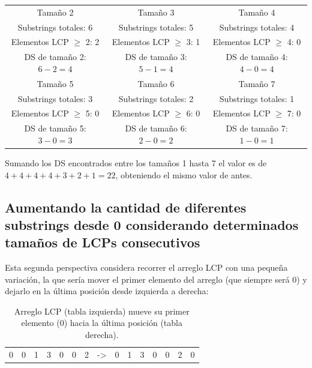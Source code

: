 \begin{table}[H]
\centering
\label{propuesta-12}
\begin{tabular}{|c|c|c|}
\hline
Tamaño 2     & Tamaño 3      &  Tamaño 4   \\
Substrings totales: 6      &  Substrings totales: 5    & Substrings totales: 4   \\
Elementos LCP $\geq$ 2: 2       & Elementos LCP $\geq$ 3: 1       & Elementos LCP $\geq$ 4: 0      \\
DS de tamaño 2: $6-2 = 4$      & DS de tamaño 3: $5-1 = 4$          & DS de tamaño 4: $4-0 = 4$            \\ \hline
Tamaño 5     & Tamaño 6      &  Tamaño 7   \\
Substrings totales: 3      &  Substrings totales: 2    & Substrings totales: 1   \\
Elementos LCP $\geq$ 5: 0       & Elementos LCP $\geq$ 6: 0       & Elementos LCP $\geq$ 7: 0      \\
DS de tamaño 5: $3-0 = 3$      & DS de tamaño 6: $2-0 = 2$          & DS de tamaño 7: $1-0 = 1$            \\ \hline
\end{tabular}
\end{table}

Sumando los DS encontrados entre los tamaños 1 hasta 7 el valor es de $4+4+4+4+3+2+1=22$, obteniendo el mismo valor de antes.

\subsection{Aumentando la cantidad de diferentes substrings desde 0 considerando determinados tamaños de LCPs consecutivos}

Esta segunda perspectiva considera recorrer el arreglo LCP con una pequeña variación, la que sería mover el primer elemento del arreglo (que siempre será 0) y dejarlo en la última posición desde izquierda a derecha:

\begin{table}[h]
\centering
\label{propuesta-2}
\begin{tabular}{|l|l|l|l|l|l|l|l|l|l|l|l|l|l|l|}
\cline{1-7} \cline{9-15}
0 & 0 & 1 & 3 & 0 & 0 & 2 & -\textgreater & 0 & 1 & 3 & 0 & 0 & 2 & 0 \\ \cline{1-7} \cline{9-15} 
\end{tabular}
\caption{Arreglo LCP (tabla izquierda) mueve su primer elemento (0) hacia la última posición (tabla derecha).}
\end{table}

